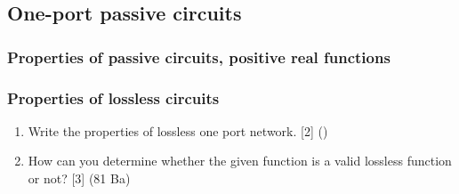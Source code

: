\documentclass[12pt]{article}
\begin{document}
\subsection{One-port passive circuits}
\subsubsection{Properties of passive circuits, positive real functions}
\subsubsection{Properties of lossless circuits}
\begin{enumerate}[noitemsep, topsep=0pt]
	\item Write the properties of lossless one port network. \hfill [2] ()
	
	\item How can you determine whether the given function is a valid lossless function or not? \hfill [3] (81 Ba)
\end{enumerate}
\end{document}
